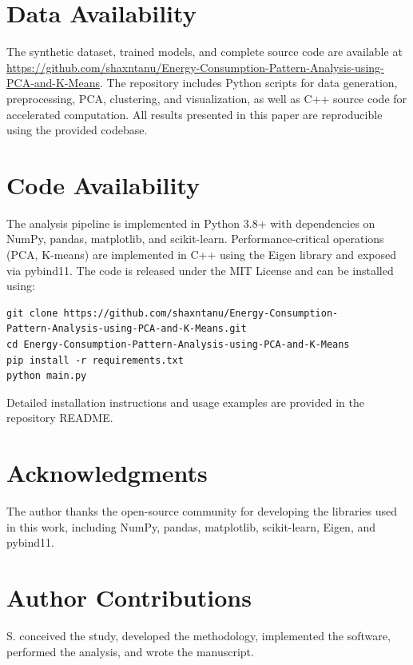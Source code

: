 \documentclass[11pt]{article}
\begin{document}
\section*{Data Availability}

The synthetic dataset, trained models, and complete source code are available at \url{https://github.com/shaxntanu/Energy-Consumption-Pattern-Analysis-using-PCA-and-K-Means}. The repository includes Python scripts for data generation, preprocessing, PCA, clustering, and visualization, as well as C++ source code for accelerated computation. All results presented in this paper are reproducible using the provided codebase.

\section*{Code Availability}

The analysis pipeline is implemented in Python 3.8+ with dependencies on NumPy, pandas, matplotlib, and scikit-learn. Performance-critical operations (PCA, K-means) are implemented in C++ using the Eigen library and exposed via pybind11. The code is released under the MIT License and can be installed using:

\begin{verbatim}
git clone https://github.com/shaxntanu/Energy-Consumption-
Pattern-Analysis-using-PCA-and-K-Means.git
cd Energy-Consumption-Pattern-Analysis-using-PCA-and-K-Means
pip install -r requirements.txt
python main.py
\end{verbatim}

Detailed installation instructions and usage examples are provided in the repository README.

\section*{Acknowledgments}

The author thanks the open-source community for developing the libraries used in this work, including NumPy, pandas, matplotlib, scikit-learn, Eigen, and pybind11.

\section*{Author Contributions}

S. conceived the study, developed the methodology, implemented the software, performed the analysis, and wrote the manuscript.
\end{document}
